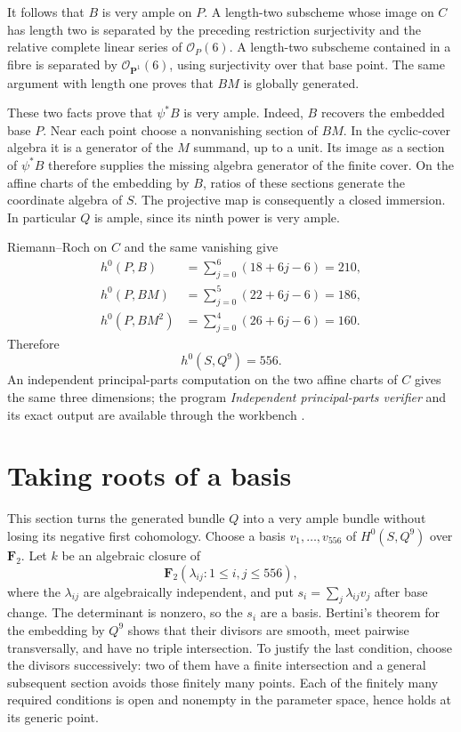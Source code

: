 \documentclass[11pt]{article}
\theoremstyle{remark}\newtheorem{remark}[theorem]{Remark}
\newcommand{\OO}{\mathcal O}
\newcommand{\F}{\mathbf F}
\newcommand{\PP}{\mathbf P}
\begin{document}
It follows that $B$ is very ample on $P$. A length-two subscheme whose image on $C$ has length two is separated by the preceding restriction surjectivity and the relative complete linear series of $\OO_P(6)$. A length-two subscheme contained in a fibre is separated by $\OO_{\PP^1}(6)$, using surjectivity over that base point. The same argument with length one proves that $BM$ is globally generated.

These two facts prove that $\psi^*B$ is very ample. Indeed, $B$ recovers the embedded base $P$. Near each point choose a nonvanishing section of $BM$. In the cyclic-cover algebra it is a generator of the $M$ summand, up to a unit. Its image as a section of $\psi^*B$ therefore supplies the missing algebra generator of the finite cover. On the affine charts of the embedding by $B$, ratios of these sections generate the coordinate algebra of $S$. The projective map is consequently a closed immersion. In particular $Q$ is ample, since its ninth power is very ample.

Riemann--Roch on $C$ and the same vanishing give
\begin{align*}
 h^0(P,B)&=\sum_{j=0}^6(18+6j-6)=210,\\
 h^0(P,BM)&=\sum_{j=0}^5(22+6j-6)=186,\\
 h^0(P,BM^2)&=\sum_{j=0}^4(26+6j-6)=160.
\end{align*}
Therefore
\begin{equation}\label{eq:556}
 h^0(S,Q^9)=556.
\end{equation}
An independent principal-parts computation on the two affine charts of $C$ gives the same three dimensions; the program \emph{Independent principal-parts verifier} and its exact output are available through the workbench \cite{Workbench}.

\section{Taking roots of a basis}

This section turns the generated bundle $Q$ into a very ample bundle without losing its negative first cohomology. Choose a basis $v_1,\ldots,v_{556}$ of $H^0(S,Q^9)$ over $\F_2$. Let $k$ be an algebraic closure of
\[
 \F_2(\lambda_{ij}:1\leq i,j\leq556),
\]
where the $\lambda_{ij}$ are algebraically independent, and put $s_i=\sum_j\lambda_{ij}v_j$ after base change. The determinant is nonzero, so the $s_i$ are a basis. Bertini's theorem for the embedding by $Q^9$ shows that their divisors are smooth, meet pairwise transversally, and have no triple intersection. To justify the last condition, choose the divisors successively: two of them have a finite intersection and a general subsequent section avoids those finitely many points. Each of the finitely many required conditions is open and nonempty in the parameter space, hence holds at its generic point.
\end{document}
